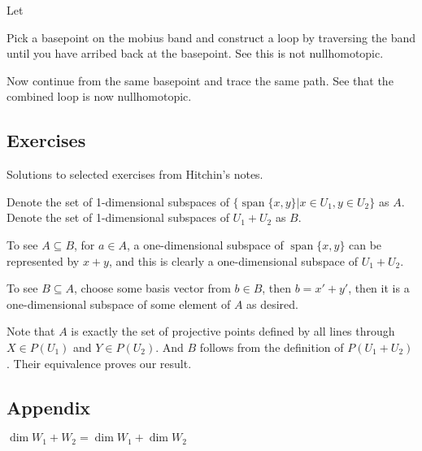 \documentclass[10pt]{article}
\begin{document}
Let 



Pick a basepoint on the mobius band and construct a loop by traversing the band
until you have arribed back at the basepoint. See this is not nullhomotopic.

Now continue from the same basepoint and trace the same path. See that the
combined loop is now nullhomotopic.




\subsection{Exercises}

Solutions to selected exercises from Hitchin's notes.

\begin{exercise}

	Denote the set of 1-dimensional subspaces of $\{ \operatorname{span} \{x, y\} | x \in U_1,
y \in U_2 \}$ as $A$. Denote the set of 1-dimensional subspaces of $U_1 +
U_2$ as $B$.

To see $A \subseteq B$, for $a \in A$, a one-dimensional subspace of
$\operatorname{span} \{x, y\}$ can be represented by $x + y$, and this is clearly a
one-dimensional subspace of $U_1 + U_2$.

To see $B \subseteq A$, choose some basis vector from $b \in B$, then $b = x'
+ y'$, then it is a one-dimensional subspace of some element of $A$ as
desired.

Note that $A$ is exactly the set of projective points defined by all lines
through $X \in P(U_1)$ and $Y \in P(U_2)$. And $B$ follows from the definition
of $P(U_1 + U_2)$. Their equivalence proves our result.

\end{exercise}

\subsection{Appendix}

\begin{theorem}
	$\dim W_1 + W_2 = \dim W_1 + \dim W_2$
\end{theorem}
\end{document}
